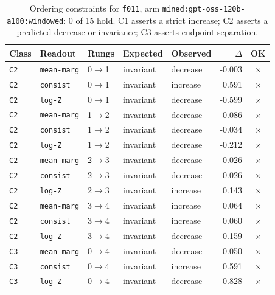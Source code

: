 \documentclass[11pt]{article}
\begin{document}
\begin{table}[htbp]
\centering
\small
\caption{Ordering constraints for \texttt{f011}, arm \texttt{mined:gpt-oss-120b-a100:windowed}: 0 of 15 hold. C1 asserts a strict increase; C2 asserts a predicted decrease or invariance; C3 asserts endpoint separation.}
\label{tab:ladder-f011-mined-gpt-oss-120b-a100-windowed}
\begin{tabular}{lllllrc}
\toprule
Class & Readout & Rungs & Expected & Observed & $\Delta$ & OK \\
\midrule
\texttt{C2} & \texttt{mean-marg} & 0$\to$1 & invariant & decrease & -0.003 & $\times$ \\
\texttt{C2} & \texttt{consist} & 0$\to$1 & invariant & increase & 0.591 & $\times$ \\
\texttt{C2} & \texttt{log-Z} & 0$\to$1 & invariant & decrease & -0.599 & $\times$ \\
\texttt{C2} & \texttt{mean-marg} & 1$\to$2 & invariant & decrease & -0.086 & $\times$ \\
\texttt{C2} & \texttt{consist} & 1$\to$2 & invariant & decrease & -0.034 & $\times$ \\
\texttt{C2} & \texttt{log-Z} & 1$\to$2 & invariant & decrease & -0.212 & $\times$ \\
\texttt{C2} & \texttt{mean-marg} & 2$\to$3 & invariant & decrease & -0.026 & $\times$ \\
\texttt{C2} & \texttt{consist} & 2$\to$3 & invariant & decrease & -0.026 & $\times$ \\
\texttt{C2} & \texttt{log-Z} & 2$\to$3 & invariant & increase & 0.143 & $\times$ \\
\texttt{C2} & \texttt{mean-marg} & 3$\to$4 & invariant & increase & 0.064 & $\times$ \\
\texttt{C2} & \texttt{consist} & 3$\to$4 & invariant & increase & 0.060 & $\times$ \\
\texttt{C2} & \texttt{log-Z} & 3$\to$4 & invariant & decrease & -0.159 & $\times$ \\
\texttt{C3} & \texttt{mean-marg} & 0$\to$4 & invariant & decrease & -0.050 & $\times$ \\
\texttt{C3} & \texttt{consist} & 0$\to$4 & invariant & increase & 0.591 & $\times$ \\
\texttt{C3} & \texttt{log-Z} & 0$\to$4 & invariant & decrease & -0.828 & $\times$ \\
\bottomrule
\end{tabular}
\end{table}
\end{document}

